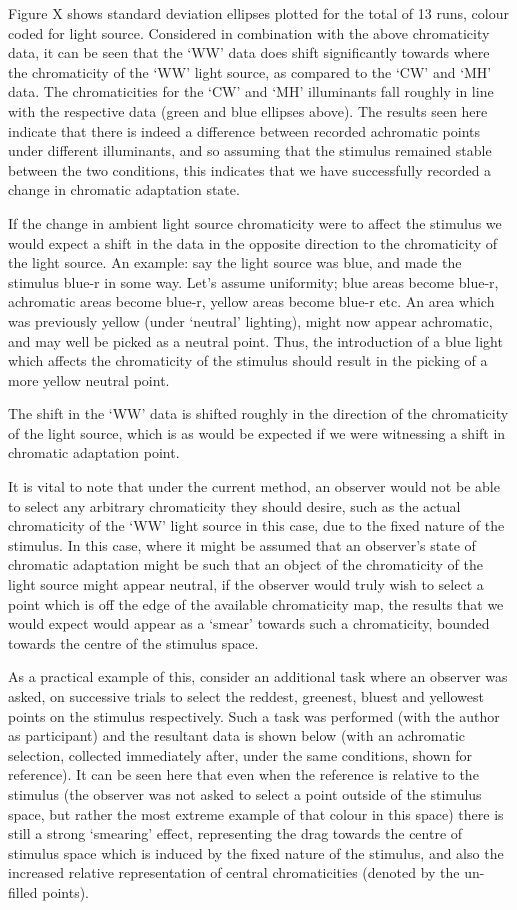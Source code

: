 Figure X shows standard deviation ellipses plotted for the total of 13 runs, colour coded for light source. Considered in combination with the above chromaticity data, it can be seen that the `WW' data does shift significantly towards where the chromaticity of the `WW' light source, as compared to the `CW' and `MH' data. The chromaticities for the `CW' and `MH' illuminants fall roughly in line with the respective data (green and blue ellipses above).
The results seen here indicate that there is indeed a difference between recorded achromatic points under different illuminants, and so assuming that the stimulus remained stable between the two conditions, this indicates that we have successfully recorded a change in chromatic adaptation state. 

If the change in ambient light source chromaticity were to affect the stimulus we would expect a shift in the data in the opposite direction to the chromaticity of the light source. An example: say the light source was blue, and made the stimulus blue-r in some way. Let's assume uniformity; blue areas become blue-r, achromatic areas become blue-r, yellow areas become blue-r etc. An area which was previously yellow (under `neutral' lighting), might now appear achromatic, and may well be picked as a neutral point. Thus, the introduction of a blue light which affects the chromaticity of the stimulus should result in the picking of a more yellow neutral point.

The shift in the `WW' data is shifted roughly in the direction of the chromaticity of the light source, which is as would be expected if we were witnessing a shift in chromatic adaptation point.

It is vital to note that under the current method, an observer would not be able to select any arbitrary chromaticity they should desire, such as the actual chromaticity of the `WW' light source in this case, due to the fixed nature of the stimulus. In this case, where it might be assumed that an observer's state of chromatic adaptation might be such that an object of the chromaticity of the light source might appear neutral, if the observer would truly wish to select a point which is off the edge of the available chromaticity map, the results that we would expect would appear as a `smear' towards such a chromaticity, bounded towards the centre of the stimulus space.

As a practical example of this, consider an additional task where an observer was asked, on successive trials to select the reddest, greenest, bluest and yellowest points on the stimulus respectively. Such a task was performed (with the author as participant) and the resultant data is shown below (with an achromatic selection, collected immediately after, under the same conditions, shown for reference). It can be seen here that even when the reference is relative to the stimulus (the observer was not asked to select a point outside of the stimulus space, but rather the most extreme example of that colour in this space) there is still a strong `smearing' effect, representing the drag towards the centre of stimulus space which is induced by the fixed nature of the stimulus, and also the increased relative representation of central chromaticities (denoted by the un-filled points).

